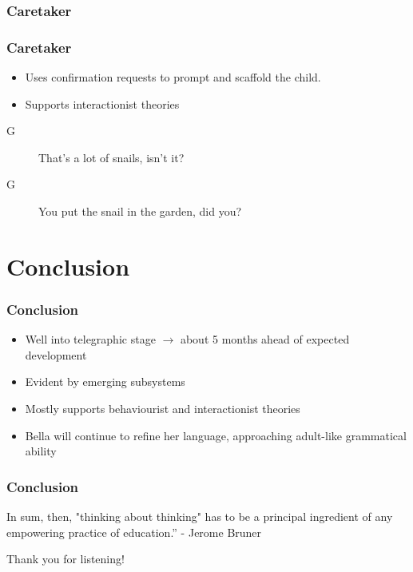 \documentclass[compress]{beamer}
\begin{document}
\subsubsection{Caretaker}
\begin{frame}
	\frametitle{Caretaker}
	
	\begin{itemize}
		\item Uses confirmation requests to prompt and scaffold the child.
		\item Supports interactionist theories
	\end{itemize}
	\begin{description}
		\item[G] That's a lot of snails, isn't it?
		\item[G] You put the snail in the garden, did you?
	\end{description}
	
\end{frame}

\section{Conclusion}
\begin{frame}
	\frametitle{Conclusion}
	
	\begin{itemize}
		\item Well into telegraphic stage $\rightarrow$ about 5 months ahead of expected development
		\item Evident by emerging subsystems
		\item Mostly supports behaviourist and interactionist theories
		\item Bella will continue to refine her language, approaching adult-like grammatical ability
	\end{itemize}
	
\end{frame}

\begin{frame}
	\frametitle{Conclusion}
	
	\begin{displayquote}
		In sum, then, "thinking about thinking" has to be a principal ingredient of any empowering practice of education.” - Jerome Bruner	
	\end{displayquote}
	
\end{frame}

\begin{frame}
	\centering
	Thank you for listening!
\end{frame}
\end{document}
